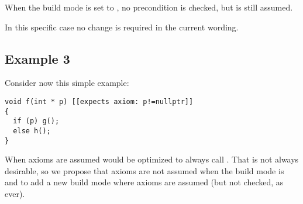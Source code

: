 When the build mode is set to , no precondition is checked, but
 is still assumed. 

In this specific case no change is required in the current wording.


\subsection{Example 3}

Consider now this simple example:

\begin{lstlisting}
void f(int * p) [[expects axiom: p!=nullptr]]
{
  if (p) g();
  else h();
}
\end{lstlisting}

When axioms are assumed  would be optimized to always call 
. 
That is not always desirable, so we propose that axioms are not assumed when
the build mode is  and to add a new build mode 
where axioms are assumed (but not checked, as ever).

